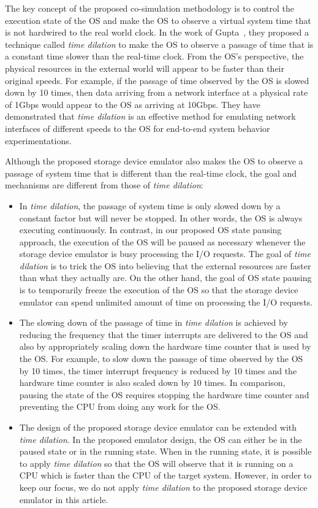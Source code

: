 The key concept of the proposed co-simulation methodology is to control the execution state of the OS and make the OS to observe a virtual system time that is not hardwired to the real world clock. In the work of Gupta~\cite{Gupta:2006}, they proposed a technique called \textit{time dilation} to make the OS to observe a passage of time that is a constant time slower than the real-time clock. From the OS’s perspective, the physical resources in the external world will appear to be faster than their original speeds. For example, if the passage of time observed by the OS is slowed down by 10 times, then data arriving from a network interface at a physical rate of 1Gbps would appear to the OS as arriving at 10Gbps. They have demonstrated that \textit{time dilation} is an effective method for emulating network interfaces of different speeds to the OS for end-to-end system behavior experimentations. 

Although the proposed storage device emulator also makes the OS to observe a passage of system time that is different than the real-time clock, the goal and mechanisms are different from those of \textit{time dilation}:

\begin{itemize}
	\item  In \textit{time dilation}, the passage of system time is only slowed down by a constant factor but will never be stopped. In other words, the OS is always executing continuously. In contrast, in our proposed OS state pausing approach, the execution of the OS will be paused as necessary whenever the storage device emulator is busy processing the I/O requests. The goal of \textit{time dilation} is to trick the OS into believing that the external resources are faster than what they actually are. On the other hand, the goal of OS state pausing is to temporarily freeze the execution of the OS so that the storage device emulator can spend unlimited amount of time on processing the I/O requests.
	
	\item The slowing down of the passage of time in \textit{time dilation} is achieved by reducing the frequency that the timer interrupts are delivered to the OS and also by appropriately scaling down the hardware time counter that is used by the OS. For example, to slow down the passage of time observed by the OS by 10 times, the timer interrupt frequency is reduced by 10 times and the hardware time counter is also scaled down by 10 times. In comparison, pausing the state of the OS requires stopping the hardware time counter and preventing the CPU from doing any work for the OS.
	
	\item The design of the proposed storage device emulator can be extended with \textit{time dilation}. In the proposed emulator design, the OS can either be in the paused state or in the running state. When in the running state, it is possible to apply \textit{time dilation} so that the OS will observe that it is running on a CPU which is faster than the CPU of the target system. However, in order to keep our focus, we do not apply \textit{time dilation} to the proposed storage device emulator in this article.
\end{itemize}

